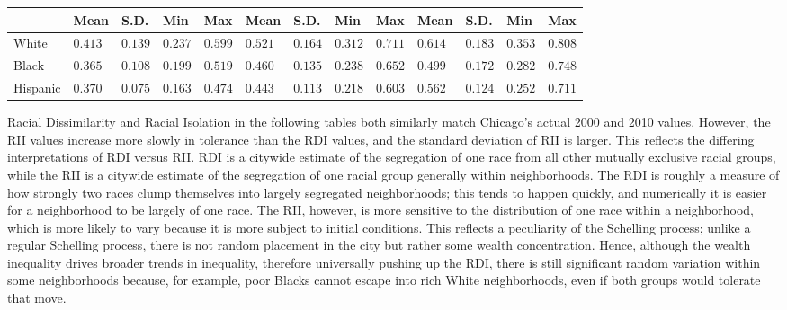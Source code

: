 {\begin{table}[h!]
{\begin{tabular}{lllllllllllll}
\multicolumn{1}{l|}{}         & Mean & S.D. & Min & \multicolumn{1}{l|}{Max} & Mean & S.D. & Min & \multicolumn{1}{l|}{Max} & Mean    & S.D.    & Min    & Max   \\ \hline
\multicolumn{1}{l|}{White}    & $0.413$ & $0.139$ & $0.237$ & \multicolumn{1}{l|}{$0.599$} & $0.521$ & $0.164$ & $0.312$ & \multicolumn{1}{l|}{$0.711$} & $0.614$ & $0.183$ & $0.353$ & $0.808$ \\
\multicolumn{1}{l|}{Black}    & $0.365$ & $0.108$ & $0.199$ & \multicolumn{1}{l|}{$0.519$} & $0.460$ & $0.135$ & $0.238$ & \multicolumn{1}{l|}{$0.652$} & $0.499$ & $0.172$ & $0.282$ & $0.748$ \\
\multicolumn{1}{l|}{Hispanic} & $0.370$ & $0.075$ & $0.163$ & \multicolumn{1}{l|}{$0.474$} & $0.443$ & $0.113$ & $0.218$ & \multicolumn{1}{l|}{$0.603$} & $0.562$ & $0.124$ & $0.252$ & $0.711$ \\ \hline \hline
\end{tabular}
}
\end{table}

Racial Dissimilarity and Racial Isolation in the following tables both similarly match Chicago's actual 2000 and 2010 values. However, the RII values increase more slowly in tolerance than the RDI values, and the standard deviation of RII is larger. This reflects the differing interpretations of RDI versus RII. RDI is a citywide estimate of the segregation of one race from all other mutually exclusive racial groups, while the RII is a citywide estimate of the segregation of one racial group generally within neighborhoods. The RDI is roughly a measure of how strongly two races clump themselves into largely segregated neighborhoods; this tends to happen quickly, and numerically it is easier for a neighborhood to be largely of one race. The RII, however, is more sensitive to the distribution of one race within a neighborhood, which is more likely to vary because it is more subject to initial conditions. This reflects a peculiarity of the Schelling process; unlike a regular Schelling process, there is not random placement in the city but rather some wealth concentration. Hence, although the wealth inequality drives broader trends in inequality, therefore universally pushing up the RDI, there is still significant random variation within some neighborhoods because, for example, poor Blacks cannot escape into rich White neighborhoods, even if both groups would tolerate that move.

}
